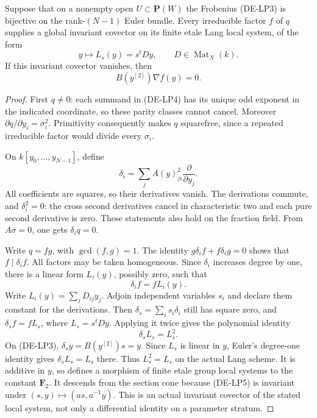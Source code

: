 \begin{lemma}
\label{lem:DE-Lang-polar-factor-covector}
Suppose that on a nonempty open \(U\subset\mathbf P(W)\) the
Frobenius (DE-LP3) is bijective on the rank-\((N-1)\) Euler bundle.
Every irreducible factor \(f\) of \(q\) supplies a global invariant
covector on its finite etale Lang local system, of the form
\[
                 y\longmapsto L_s(y)=s^t D y,
                 \qquad D\in\operatorname{Mat}_N(k).
 \tag{DE-LP5}
\]
If this invariant covector vanishes, then
\[
                   B(y^{[2]})\nabla f(y)=0.
 \tag{DE-LP6}
\]
\end{lemma}
\begin{proof}
First \(q\ne0\): each summand in (DE-LP4) has its unique odd
exponent in the indicated coordinate, so these parity classes
cannot cancel. Moreover
\(\partial q/\partial y_i=\sigma_i^2\). Primitivity consequently
makes \(q\) squarefree, since a repeated irreducible factor would
divide every \(\sigma_i\).

On \(k[y_0,\ldots,y_{N-1}]\), define
\[
 \delta_i=\sum_j A(y)_{ji}^2\frac{\partial}{\partial y_j}.
 \tag{DE-LP7}
\]
All coefficients are squares, so their derivatives vanish.
The derivations commute, and \(\delta_i^2=0\): the cross second
derivatives cancel in characteristic two and each pure second
derivative is zero. These statements also hold on the fraction
field. From \(A\sigma=0\), one gets \(\delta_iq=0\).

Write \(q=fg\), with \(\gcd(f,g)=1\). The identity
\(g\delta_i f+f\delta_i g=0\) shows that
\(f\mid\delta_i f\). All factors may be taken homogeneous.
Since \(\delta_i\) increases degree by one, there is a linear
form \(L_i(y)\), possibly zero, such that
\[
                        \delta_i f=fL_i(y).
 \tag{DE-LP8}
\]
Write \(L_i(y)=\sum_jD_{ij}y_j\). Adjoin independent variables
\(s_i\) and declare them constant for the derivations. Then
\(\delta_s=\sum_i s_i\delta_i\) still has square zero, and
\(\delta_s f=fL_s\), where \(L_s=s^tDy\). Applying it twice gives
the polynomial identity
\[
                        \delta_sL_s=L_s^2.
 \tag{DE-LP9}
\]
On (DE-LP3), \(\delta_s y=B(y^{[2]})s=y\). Since \(L_s\)
is linear in \(y\), Euler's degree-one identity gives
\(\delta_sL_s=L_s\) there. Thus \(L_s^2=L_s\) on the actual
Lang scheme. It is additive in \(y\), so defines a morphism of
finite etale group local systems to the constant \(\mathbf F_2\).
It descends from the section cone because (DE-LP5) is invariant
under \((s,y)\mapsto(a s,a^{-1}y)\). This is an actual invariant
covector of the stated local system, not only a differential
identity on a parameter stratum.


\end{proof}
